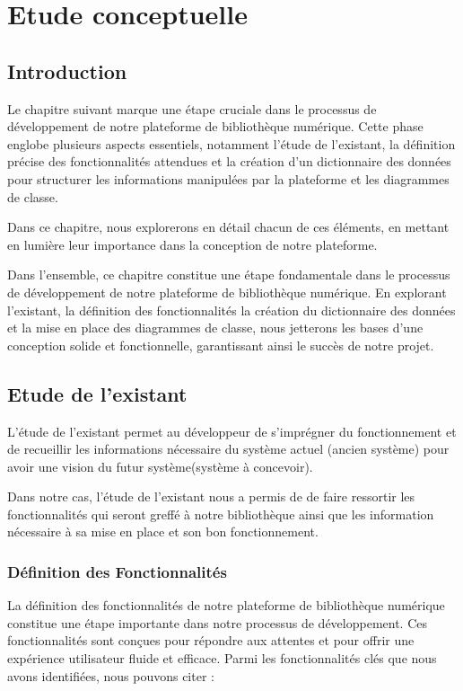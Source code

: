 \chapter{Etude conceptuelle}
\begin{spacing}{1.2}
\minitoc
\thispagestyle{MyStyle}
\end{spacing}
\newpage

\section*{Introduction}
Le chapitre suivant marque une étape cruciale dans le processus de développement de notre plateforme de bibliothèque numérique. Cette phase englobe plusieurs aspects essentiels, notamment l'étude de l'existant, la définition précise des fonctionnalités attendues et la création d'un dictionnaire des données pour structurer les informations manipulées par la plateforme et les diagrammes de classe.\par
Dans ce chapitre, nous explorerons en détail chacun de ces éléments, en mettant en lumière leur importance dans la conception de notre plateforme.\par

Dans l'ensemble, ce chapitre constitue une étape fondamentale dans le processus de développement de notre plateforme de bibliothèque numérique. En explorant l'existant, la définition des fonctionnalités la création du dictionnaire des données et la mise en place des diagrammes de classe, nous jetterons les bases d'une conception solide et fonctionnelle, garantissant ainsi le succès de notre projet.
\par
\section{Etude de l'existant}
L'étude de l'existant permet au développeur de s'imprégner du fonctionnement et de recueillir les informations nécessaire du système actuel (ancien système) pour avoir une vision du futur système(système à concevoir).\par
Dans notre cas, l'étude de l'existant nous a permis de de faire ressortir les fonctionnalités qui seront greffé à notre bibliothèque ainsi que les information nécessaire à sa mise en place et son bon fonctionnement.

\subsection{Définition des Fonctionnalités }
La définition des fonctionnalités de notre plateforme de bibliothèque numérique constitue une étape importante dans notre processus de développement. Ces fonctionnalités sont conçues pour répondre aux attentes et pour offrir une expérience utilisateur fluide et efficace. Parmi les fonctionnalités clés que nous avons identifiées, nous pouvons citer :

